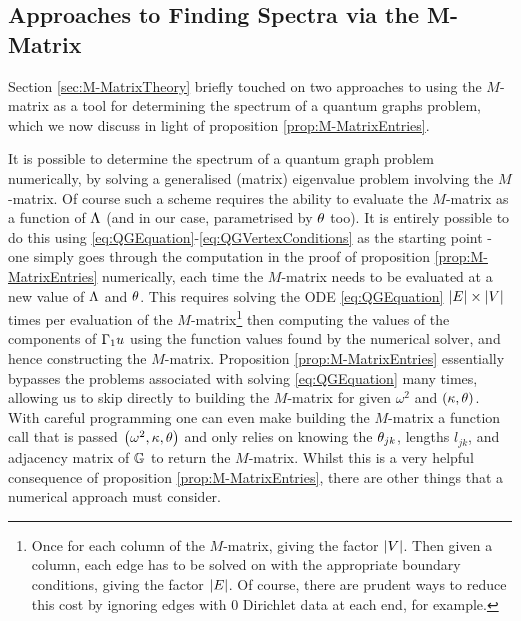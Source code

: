 \subsection{Approaches to Finding Spectra via the M-Matrix} \label{sec:NumericalMethodsDiscussion}
Section \ref{sec:M-MatrixTheory} briefly touched on two approaches to using the $M$-matrix as a tool for determining the spectrum of a quantum graphs problem, which we now discuss in light of proposition \ref{prop:M-MatrixEntries}. \newline

It is possible to determine the spectrum of a quantum graph problem numerically, by solving a generalised (matrix) eigenvalue problem involving the $M$-matrix.
Of course such a scheme requires the ability to evaluate the $M$-matrix as a function of $\Lambda$ (and in our case, parametrised by $\theta$ too).
It is entirely possible to do this using \eqref{eq:QGEquation}-\eqref{eq:QGVertexConditions} as the starting point - one simply goes through the computation in the proof of proposition \ref{prop:M-MatrixEntries} numerically, each time the $M$-matrix needs to be evaluated at a new value of $\Lambda$ and $\theta$.
This requires solving the ODE \eqref{eq:QGEquation} $\left\lvert E \right\rvert\times\left\lvert V \right\rvert$ times per evaluation of the $M$-matrix\footnote{Once for each column of the $M$-matrix, giving the factor $\left\lvert V \right\rvert$. 
Then given a column, each edge has to be solved on with the appropriate boundary conditions, giving the factor $\left\lvert E \right\rvert$. 
Of course, there are prudent ways to reduce this cost by ignoring edges with 0 Dirichlet data at each end, for example.}
then computing the values of the components of $\Gamma_1 u$ using the function values found by the numerical solver, and hence constructing the $M$-matrix.
Proposition \ref{prop:M-MatrixEntries} essentially bypasses the problems associated with solving \eqref{eq:QGEquation} many times, allowing us to skip directly to building the $M$-matrix for given $\omega^2$ and $\left( \kappa, \theta \right)$.
With careful programming one can even make building the $M$-matrix a function call that is passed $\left( \omega^2, \kappa, \theta \right)$ and only relies on knowing the $\theta_{jk}$, lengths $l_{jk}$, and adjacency matrix of $\mathbb{G}$ to return the $M$-matrix.
Whilst this is a very helpful consequence of proposition \ref{prop:M-MatrixEntries}, there are other things that a numerical approach must consider.
